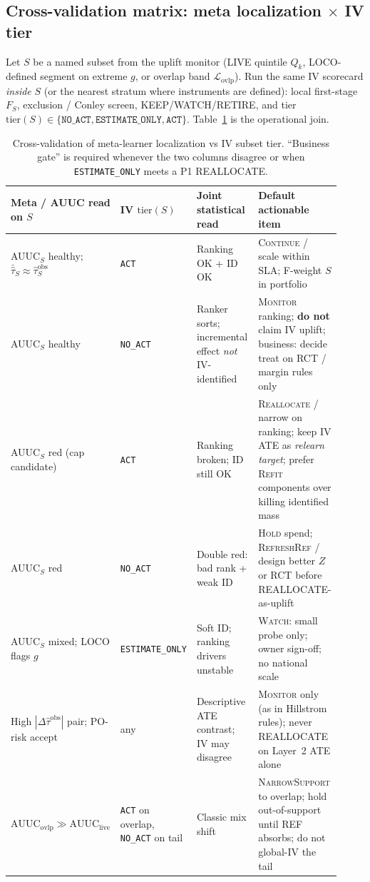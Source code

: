 \documentclass{article}
\begin{document}
\subsection{Cross-validation matrix: meta localization $\times$ IV tier}
\label{sec:cross-validate}

Let $S$ be a named subset from the uplift monitor
(LIVE quintile $Q_k$, LOCO-defined segment on extreme $g$, or overlap
band $\mathcal{L}_{\mathrm{ovlp}}$).
Run the same IV scorecard \emph{inside} $S$ (or the nearest stratum where
instruments are defined): local first-stage $F_S$, exclusion / Conley
screen, KEEP/WATCH/RETIRE, and tier
$\mathrm{tier}(S)\in\{\texttt{NO\_ACT},\texttt{ESTIMATE\_ONLY},\texttt{ACT}\}$.
Table~\ref{tab:cross-matrix} is the operational join.

\begin{table}[H]
\centering
\small
\caption{Cross-validation of meta-learner localization vs IV subset tier.
``Business gate'' is required whenever the two columns disagree or when
\texttt{ESTIMATE\_ONLY} meets a P1 REALLOCATE.}
\label{tab:cross-matrix}
\begin{tabular}{@{}p{0.22\linewidth}p{0.22\linewidth}p{0.24\linewidth}p{0.24\linewidth}@{}}
\toprule
Meta / AUUC read on $S$ & IV $\mathrm{tier}(S)$ & Joint statistical read & Default actionable item \\
\midrule
AUUC$_S$ healthy; $\bar{\hat\tau}_S\approx\widehat{\tau}^{\mathrm{obs}}_S$ &
\texttt{ACT} &
Ranking OK + ID OK &
\textsc{Continue} / scale within SLA; F-weight $S$ in portfolio \\
\addlinespace
AUUC$_S$ healthy &
\texttt{NO\_ACT} &
Ranker sorts; incremental effect \emph{not} IV-identified &
\textsc{Monitor} ranking; \textbf{do not} claim IV uplift; business: decide treat on RCT / margin rules only \\
\addlinespace
AUUC$_S$ red (cap candidate) &
\texttt{ACT} &
Ranking broken; ID still OK &
\textsc{Reallocate} / narrow on ranking; keep IV ATE as \emph{relearn target}; prefer \textsc{Refit} components over killing identified mass \\
\addlinespace
AUUC$_S$ red &
\texttt{NO\_ACT} &
Double red: bad rank + weak ID &
\textsc{Hold} spend; \textsc{RefreshRef} / design better $Z$ or RCT before REALLOCATE-as-uplift \\
\addlinespace
AUUC$_S$ mixed; LOCO flags $g$ &
\texttt{ESTIMATE\_ONLY} &
Soft ID; ranking drivers unstable &
\textsc{Watch}: small probe only; owner sign-off; no national scale \\
\addlinespace
High $|\Delta\widehat{\tau}^{\mathrm{obs}}|$ pair; PO-risk accept &
any &
Descriptive ATE contrast; IV may disagree &
\textsc{Monitor} only (as in Hillstrom rules); never REALLOCATE on Layer~2 ATE alone \\
\addlinespace
$\mathrm{AUUC}_{\mathrm{ovlp}}\gg\mathrm{AUUC}_{\mathrm{live}}$ &
\texttt{ACT} on overlap, \texttt{NO\_ACT} on tail &
Classic mix shift &
\textsc{NarrowSupport} to overlap; hold out-of-support until REF absorbs; do not global-IV the tail \\
\bottomrule
\end{tabular}
\end{table}
\end{document}
